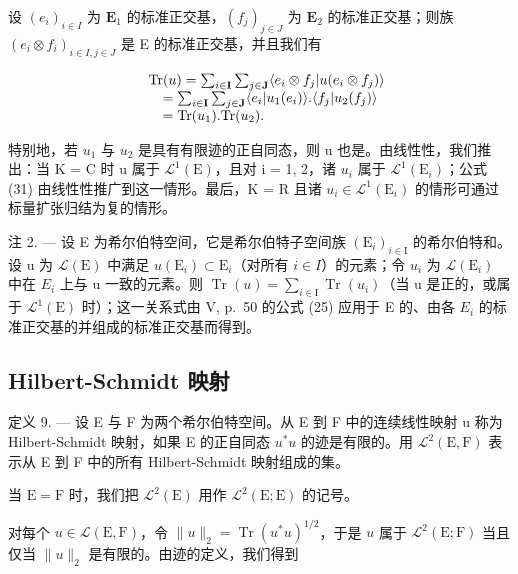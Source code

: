 设 \((e_i)_{i\in I}\) 为 \(\mathbf{E}_1\) 的标准正交基，\((f_j)_{j\in J}\) 为 \(\mathbf{E}_2\) 的标准正交基；则族 \((e_i\otimes f_i)_{i\in I,j\in J}\) 是 E 的标准正交基，并且我们有

\[
\begin{array}{r l} & {\mathrm{Tr} (u) = \sum_ {i \in \mathbf {I}} \sum_ {j \in \mathbf {J}} \langle e _ {i} \otimes f _ {j} | u (e _ {i} \otimes f _ {j}) \rangle} \\ & {\quad = \sum_ {i \in \mathbf {I}} \sum_ {j \in \mathbf {J}} \langle e _ {i} | u _ {1} (e _ {i}) \rangle . \langle f _ {j} | u _ {2} (f _ {j}) \rangle} \\ & {\quad = \mathrm{Tr} (u _ {1}). \mathrm{Tr} (u _ {2}).} \end{array}
\]

特别地，若 \(u_{1}\) 与 \(u_{2}\) 是具有有限迹的正自同态，则 u 也是。由线性性，我们推出：当 K = C 时 u 属于 \(\mathcal{L}^{1}(\mathrm{E})\)，且对 i = 1, 2，诸 \(u_{i}\) 属于 \(\mathcal{L}^{1}(\mathrm{E}_{i})\)；公式 (31) 由线性性推广到这一情形。最后，K = R 且诸 \(u_{i} \in \mathcal{L}^{1}(\mathrm{E}_{i})\) 的情形可通过标量扩张归结为复的情形。

注 2. --- 设 E 为希尔伯特空间，它是希尔伯特子空间族 \((\mathrm{E}_{i})_{i\in\mathrm{I}}\) 的希尔伯特和。设 u 为 \(\mathcal{L}(\mathrm{E})\) 中满足 \(u(\mathrm{E}_{i}) \subset \mathrm{E}_{i}\)（对所有 \(i \in I\)）的元素；令 \(u_{i}\) 为 \(\mathcal{L}(\mathrm{E}_{i})\) 中在 \(E_{i}\) 上与 u 一致的元素。则 \(\operatorname{Tr}(u) = \sum_{i \in \mathrm{I}} \operatorname{Tr}(u_{i})\)（当 u 是正的，或属于 \(\mathcal{L}^{1}(\mathrm{E})\) 时）；这一关系式由 V, p.~50 的公式 (25) 应用于 E 的、由各 \(E_{i}\) 的标准正交基的并组成的标准正交基而得到。

\subsection{Hilbert-Schmidt 映射}

定义 9. --- 设 E 与 F 为两个希尔伯特空间。从 E 到 F 中的连续线性映射 u 称为 Hilbert-Schmidt 映射，如果 E 的正自同态 \(u^{*}u\) 的迹是有限的。用 \(\mathcal{L}^{2}(\mathrm{E},\mathrm{F})\) 表示从 E 到 F 中的所有 Hilbert-Schmidt 映射组成的集。

当 \(\mathrm{E} = \mathrm{F}\) 时，我们把 \(\mathcal{L}^2(\mathrm{E})\) 用作 \(\mathcal{L}^2(\mathrm{E};\mathrm{E})\) 的记号。

对每个 \(u \in \mathcal{L}(\mathrm{E},\mathrm{F})\)，令 \(\| u \|_2 = \operatorname{Tr}(u^* u)^{1/2}\)，于是 \(u\) 属于 \(\mathcal{L}^2(\mathrm{E};\mathrm{F})\) 当且仅当 \(\| u \|_2\) 是有限的。由迹的定义，我们得到

